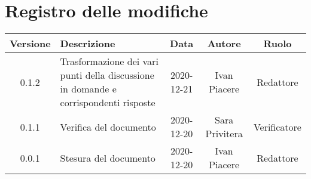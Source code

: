 \section*{Registro delle modifiche}

\begin{center}
	\begin{longtable}{|c|p{5cm}|c|c|c|}
	\hline
	\rowcolor{lighter-grayer}
	\textbf{Versione} & \textbf{Descrizione} & \textbf{Data} & \textbf{Autore} & \textbf{Ruolo} \\
	\hline
	\endfirsthead


	0.1.2 & Trasformazione dei vari punti della discussione in domande e corrispondenti risposte & 2020-12-21 & Ivan Piacere & Redattore \\
	\hline
	0.1.1 & Verifica del documento & 2020-12-20 & Sara Privitera & Verificatore \\
	\hline
	0.0.1 & Stesura del documento & 2020-12-20 & Ivan Piacere & Redattore \\
	\hline
	
    
	\end{longtable}
\end{center}
